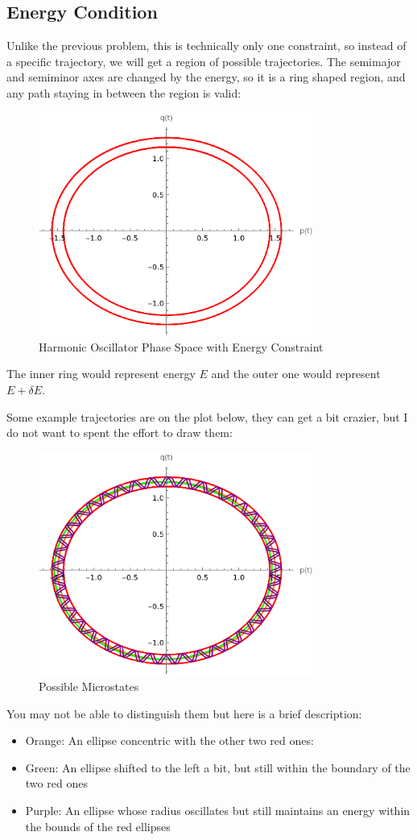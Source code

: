 \documentclass[12pt]{article}
\begin{document}
\subsection{Energy Condition}
Unlike the previous problem, this is technically only one constraint, so instead of a specific trajectory, we will get a region of possible trajectories. The semimajor and semiminor axes are changed by the energy, so it is a ring shaped region, and any path staying in between the region is valid:
\begin{figure}[H]
  \centering
  \includegraphics[width=9.0cm]{phase2.png}
  \caption{Harmonic Oscillator Phase Space with Energy Constraint}
\end{figure}
The inner ring would represent energy $E$ and the outer one would represent $E+\delta E$.

Some example trajectories are on the plot below, they can get a bit crazier, but I do not want to spent the effort to draw them:
\begin{figure}[H]
  \centering
  \includegraphics[width=9.0cm]{phase3.png}
  \caption{Possible Microstates}
\end{figure}
You may not be able to distinguish them but here is a brief description:
\begin{itemize}
\item Orange: An ellipse concentric with the other two red ones:
\item Green: An ellipse shifted to the left a bit, but still within the boundary of the two red ones
\item Purple: An ellipse whose radius oscillates but still maintains an energy within the bounds of the red ellipses
\end{itemize}
\end{document}
